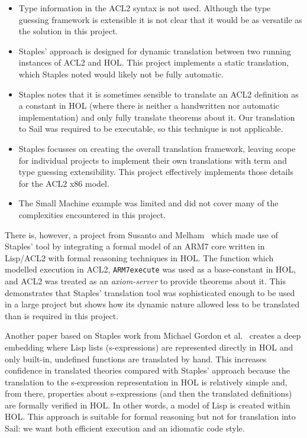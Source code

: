 \documentclass[a4paper,12pt,twoside,openright]{report}
\begin{document}
\begin{itemize}
  \item Type information in the ACL2 syntax is not used.  Although the type guessing framework is extensible it is not clear that it would be as versatile as the solution in this project.
  \item Staples' approach is designed for dynamic translation between two running instances of ACL2 and HOL.  This project implements a static translation, which Staples noted would likely not be fully automatic.
  \item Staples notes that it is sometimes sensible to translate an ACL2 definition as a constant in HOL (where there is neither a handwritten nor automatic implementation) and only fully translate theorems about it.  Our translation to Sail was required to be executable, so this technique is not applicable.
  \item Staples focusses on creating the overall translation framework, leaving scope for individual projects to implement their own translations with term and type guessing extensibility.  This project effectively implements those details for the ACL2 x86 model.
  \item The Small Machine example was limited and did not cover many of the complexities encountered in this project.
\end{itemize}

There is, however, a project from Susanto and Melham~\cite{AMBA} which made use of Staples' tool by integrating a formal model of an ARM7 core written in Lisp/ACL2 with formal reasoning techniques in HOL.  The function which modelled execution in ACL2, \texttt{ARM7execute} was used as a base-constant in HOL, and ACL2 was treated as an \emph{axiom-server} to provide theorems about it.  This demonstrates that Staples' translation tool was sophisticated enough to be used in a large project but shows how its dynamic nature allowed less to be translated than is required in this project.

Another paper based on Staples work from Michael Gordon et al.~\cite{gordon} creates a deep embedding where Lisp lists (s-expressions) are represented directly in HOL and only built-in, undefined functions are translated by hand.  This increases confidence in translated theories compared with Staples' approach because the translation to the s-expression representation in HOL is relatively simple and, from there, properties about s-expressions (and then the translated definitions) are formally verified in HOL.  In other words, a model of Lisp is created within HOL.  This approach is suitable for formal reasoning but not for translation into Sail: we want both efficient execution and an idiomatic code style.
\end{document}
